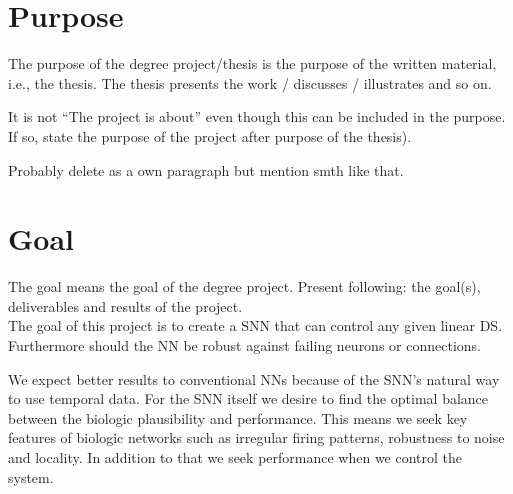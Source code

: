 \section{Purpose}
The purpose of the degree project/thesis is the purpose of the written material, i.e., the thesis. The thesis presents the work / discusses / illustrates and so on.

It is not “The project is about” even though this can be included in the purpose. If so, state the purpose of the project after purpose of the thesis).

Probably delete as a own paragraph but mention smth like that.



\section{Goal}
The goal means the goal of the degree project. Present following: the goal(s), deliverables and results of the project.\\

The goal of this project is to create a \ac{SNN} that can control any given linear \ac{DS}. Furthermore should the \ac{NN} be robust against failing neurons or connections. %

We expect better results to conventional \acp{NN} because of the \ac{SNN}'s natural way to use temporal data. For the \ac{SNN} itself we desire to find the optimal balance between the biologic plausibility and performance. This means we seek key features of biologic networks such as irregular firing patterns, robustness to noise and locality. In addition to that we seek performance when we control the system.

